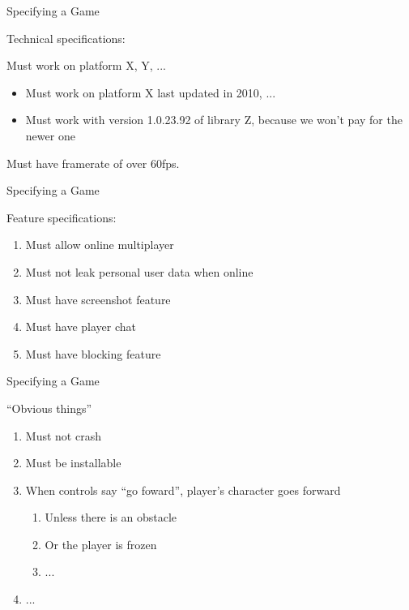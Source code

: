 \documentclass[xetex,aspectratio=169,14pt,hyperref={pdfpagelabels=true,pdflang={en-GB}}]{beamer}
\begin{document}
\begin{frame}
  {Specifying a Game}

  Technical specifications:

  \bigskip

  Must work on platform X, Y, ...
  \begin{itemize}
  \item<2-> Must work on platform X last updated in 2010, ...
  \item<3-> Must work with version 1.0.23.92 of library Z, because we won't pay for the newer one
  \end{itemize}

  \pause
  \pause
  \pause
  \bigskip

  Must have framerate of over 60fps.
\end{frame}

\begin{frame}
  {Specifying a Game}

  Feature specifications:

  \begin{enumerate}
  \item Must allow online multiplayer
  \item Must not leak personal user data when online
  \item Must have screenshot feature
  \item Must have player chat
  \item Must have blocking feature
  \end{enumerate}
\end{frame}

\begin{frame}
  {Specifying a Game}

  ``Obvious things''

  \begin{enumerate}
  \item Must not crash
  \item Must be installable
  \item When controls say ``go foward'', player's character goes forward
    \begin{enumerate}
    \item Unless there is an obstacle
    \item Or the player is frozen
    \item ...
    \end{enumerate}
  \item ...
  \end{enumerate}
\end{frame}
\end{document}
